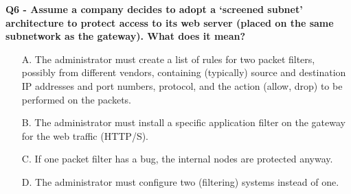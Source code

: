 \textbf{Q6 - Assume a company decides to adopt a ‘screened subnet’ architecture to protect access to its web server (placed on the same subnetwork as the gateway). What does it mean?}
\begin{itemize}
    \item[A.] The administrator must create a list of rules for two packet filters, possibly from different vendors, containing (typically) source and destination IP addresses and port numbers, protocol, and the action (allow, drop) to be performed on the packets.
    \item[B.] The administrator must install a specific application filter on the gateway for the web traffic (HTTP/S).
    \item[C.] If one packet filter has a bug, the internal nodes are protected anyway.
    \item[D.] The administrator must configure two (filtering) systems instead of one.
\end{itemize}
